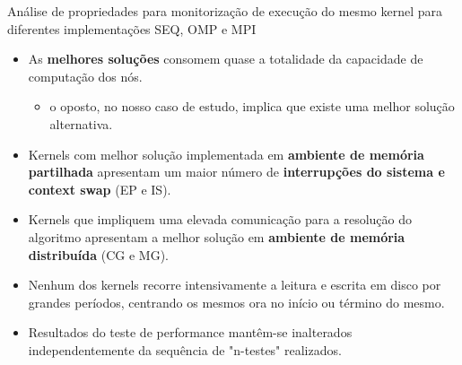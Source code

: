 \documentclass{beamer}
\begin{document}
\begin{frame}{ Análise de propriedades para monitorização de execução do mesmo kernel para diferentes implementações SEQ, OMP e MPI}

\begin{itemize}
\item \small As \textbf{melhores soluções} consomem quase a totalidade da capacidade de computação dos nós.
\begin{itemize}
\item \small o oposto, no nosso caso de estudo, implica que existe uma melhor solução alternativa.
\end{itemize}
\item \small Kernels com melhor solução implementada em \textbf{ambiente de memória partilhada} apresentam um maior número de \textbf{interrupções do sistema e context swap} (EP e IS).
\item \small Kernels que impliquem uma elevada comunicação para a resolução do algoritmo apresentam a melhor solução em \textbf{ambiente de memória distribuída} (CG e MG).
\item \small Nenhum dos kernels recorre intensivamente a leitura e escrita em disco por grandes períodos, centrando os mesmos ora no início ou término do mesmo.
\item \small Resultados do teste de performance mantêm-se inalterados independentemente da sequência de "n-testes" realizados.

\end{itemize}

\end{frame}
\end{document}
